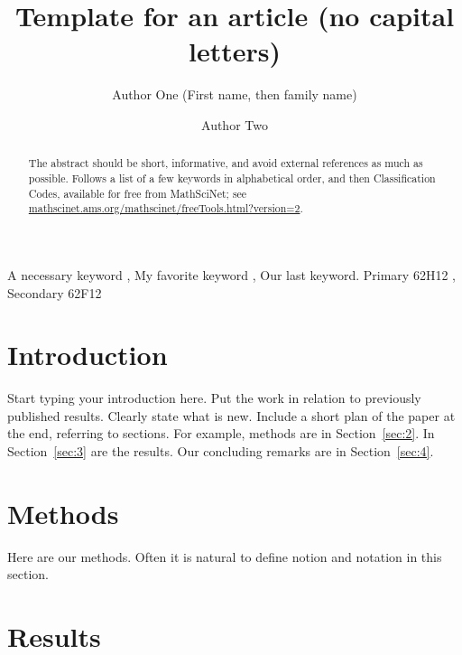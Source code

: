 \documentclass[times,sort&compress,3p]{elsarticle}
\theoremstyle{plain}%
\theoremstyle{definition}
\begin{document}
\begin{frontmatter}

\title{Template for an article (no capital letters)}

\author[1]{Author One (First name, then family name)}
\author[2]{Author Two}

\address[1]{Address of Author One in her country's language and rules}
\address[2]{Address of Author Two in his country's language and rules}


\begin{abstract}
The abstract should be short, informative, and avoid external references as much as possible. Follows a list of a few keywords in alphabetical order, and then Classification Codes, available for free from MathSciNet; see \url{mathscinet.ams.org/mathscinet/freeTools.html?version=2}.
\end{abstract}

\begin{keyword} %
A necessary keyword \sep
My favorite keyword \sep
Our last keyword.
\MSC[2020] Primary 62H12 \sep
Secondary 62F12
\end{keyword}

\end{frontmatter}

\section{Introduction\label{sec:1}}

Start typing your introduction here. Put the work in relation to previously published results. Clearly state what is new. Include a short plan of the paper at the end, referring to sections. For example, methods are in Section~\ref{sec:2}. In Section~\ref{sec:3} are the results. Our concluding remarks are in Section~\ref{sec:4}.

\section{Methods\label{sec:2}}

Here are our methods. Often it is natural to define notion and notation in this section.

\section{Results\label{sec:3}}
\end{document}
